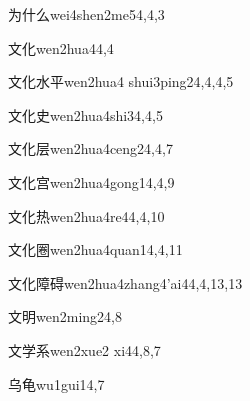 \begin{verbete}{为什么}{wei4shen2me5}{4,4,3}
\end{verbete}

\begin{verbete}{文化}{wen2hua4}{4,4}
\end{verbete}

\begin{verbete}{文化水平}{wen2hua4 shui3ping2}{4,4,4,5}
\end{verbete}

\begin{verbete}{文化史}{wen2hua4shi3}{4,4,5}
\end{verbete}

\begin{verbete}{文化层}{wen2hua4ceng2}{4,4,7}
\end{verbete}

\begin{verbete}{文化宫}{wen2hua4gong1}{4,4,9}
\end{verbete}

\begin{verbete}{文化热}{wen2hua4re4}{4,4,10}
\end{verbete}

\begin{verbete}{文化圈}{wen2hua4quan1}{4,4,11}
\end{verbete}

\begin{verbete}{文化障碍}{wen2hua4zhang4'ai4}{4,4,13,13}
\end{verbete}

\begin{verbete}{文明}{wen2ming2}{4,8}
\end{verbete}

\begin{verbete}{文学系}{wen2xue2 xi4}{4,8,7}
\end{verbete}

\begin{verbete}{乌龟}{wu1gui1}{4,7}
\end{verbete}

